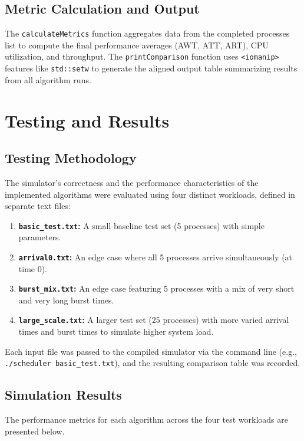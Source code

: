 \documentclass[12pt]{article}
\begin{document}
\subsection{Metric Calculation and Output}
The \texttt{calculateMetrics} function aggregates data from the completed processes list to compute the final performance averages (AWT, ATT, ART), CPU utilization, and throughput. The \texttt{printComparison} function uses \texttt{<iomanip>} features like \texttt{std::setw} to generate the aligned output table summarizing results from all algorithm runs.

\section{Testing and Results}
\subsection{Testing Methodology}
The simulator's correctness and the performance characteristics of the implemented algorithms were evaluated using four distinct workloads, defined in separate text files:
\begin{enumerate}[label=\arabic*)]
    \item \textbf{\texttt{basic\_test.txt}:} A small baseline test set (5 processes) with simple parameters.
    \item \textbf{\texttt{arrival0.txt}:} An edge case where all 5 processes arrive simultaneously (at time 0).
    \item \textbf{\texttt{burst\_mix.txt}:} An edge case featuring 5 processes with a mix of very short and very long burst times.
    \item \textbf{\texttt{large\_scale.txt}:} A larger test set (25 processes) with more varied arrival times and burst times to simulate higher system load.
\end{enumerate}
Each input file was passed to the compiled simulator via the command line (e.g., \texttt{./scheduler basic\_test.txt}), and the resulting comparison table was recorded.

\subsection{Simulation Results}
The performance metrics for each algorithm across the four test workloads are presented below. 
\end{document}
